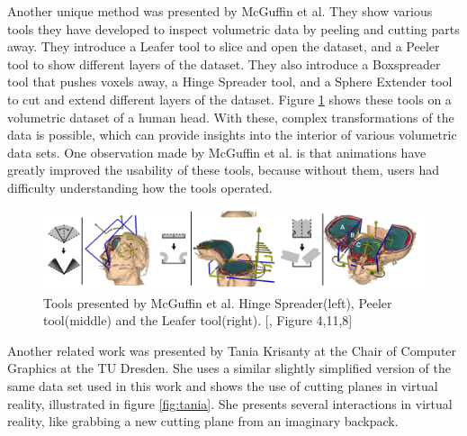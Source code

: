 Another unique method was presented by McGuffin et al.\cite{McGuffin}
They show various tools they have developed to inspect volumetric data by peeling and cutting parts away.
They introduce a Leafer tool to slice and open the dataset, and a Peeler tool to show different layers of the dataset. They also introduce a Boxspreader tool that pushes voxels away, a Hinge Spreader tool, and a Sphere Extender tool to cut and extend different layers of the dataset. Figure \ref{fig:McGuffin} shows these tools on a volumetric dataset of a human head. 
With these, complex transformations of the data is possible, which can provide insights into the interior of various volumetric data sets.
One observation made by McGuffin et al. is that animations have greatly improved the usability of these tools, because without them, users had difficulty understanding how the tools operated. 
\begin{figure}[h]
	\centering
	\includegraphics[width=1\linewidth]{fig/Images/McGuffin_fig_4_fig11_fig8}
	\caption[]{Tools presented by McGuffin et al. Hinge Spreader(left), Peeler tool(middle) and the Leafer tool(right). [\cite{McGuffin}, Figure 4,11,8]}
	\label{fig:McGuffin}
\end{figure}

Another related work was presented by Tania Krisanty at the Chair of Computer Graphics at the TU Dresden. She uses a similar slightly simplified version of the same data set used in this work and shows the use of cutting planes in virtual reality, illustrated in figure \ref{fig:tania}.\cite{krisanty_2022}
She presents several interactions in virtual reality, like grabbing a new cutting plane from an imaginary backpack. 

